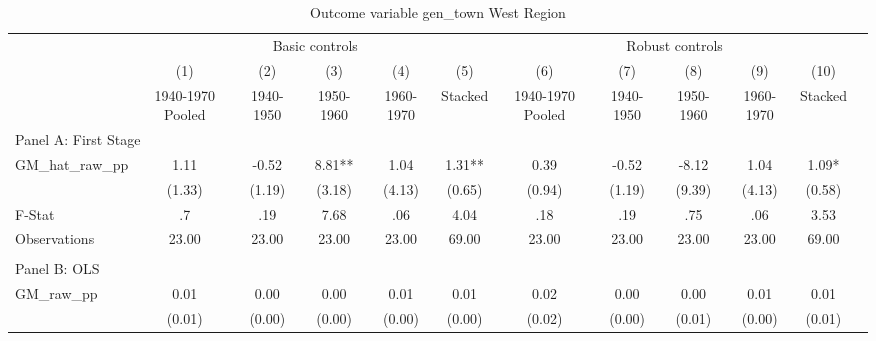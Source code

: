  \begin{table}[htbp]\centering {} \begin{threeparttable} \caption{Outcome variable gen\_town West Region} \begin{tabular}{l*{11}{c}} \toprule
          &\multicolumn{5}{c}{Basic controls}                                   &\multicolumn{5}{c}{Robust controls}                                  \\\cmidrule(lr){2-6}\cmidrule(lr){7-11}
          &\multicolumn{1}{c}{(1)}&\multicolumn{1}{c}{(2)}&\multicolumn{1}{c}{(3)}&\multicolumn{1}{c}{(4)}&\multicolumn{1}{c}{(5)}&\multicolumn{1}{c}{(6)}&\multicolumn{1}{c}{(7)}&\multicolumn{1}{c}{(8)}&\multicolumn{1}{c}{(9)}&\multicolumn{1}{c}{(10)}\\
          &\multicolumn{1}{c}{1940-1970 Pooled}&\multicolumn{1}{c}{1940-1950}&\multicolumn{1}{c}{1950-1960}&\multicolumn{1}{c}{1960-1970}&\multicolumn{1}{c}{Stacked}&\multicolumn{1}{c}{1940-1970 Pooled}&\multicolumn{1}{c}{1940-1950}&\multicolumn{1}{c}{1950-1960}&\multicolumn{1}{c}{1960-1970}&\multicolumn{1}{c}{Stacked}\\
\cmidrule(lr){1-11}
\multicolumn{10}{l}{Panel A: First Stage}\\
\cmidrule(lr){1-11}
GM\_hat\_raw\_pp&      1.11   &     -0.52   &      8.81** &      1.04   &      1.31** &      0.39   &     -0.52   &     -8.12   &      1.04   &      1.09*  \\
          &    (1.33)   &    (1.19)   &    (3.18)   &    (4.13)   &    (0.65)   &    (0.94)   &    (1.19)   &    (9.39)   &    (4.13)   &    (0.58)   \\
\midrule
F-Stat    &        .7   &       .19   &      7.68   &       .06   &      4.04   &       .18   &       .19   &       .75   &       .06   &      3.53   \\
Observations&     23.00   &     23.00   &     23.00   &     23.00   &     69.00   &     23.00   &     23.00   &     23.00   &     23.00   &     69.00   \\
\cmidrule[\heavyrulewidth](lr){1-11} \\ \cmidrule[\heavyrulewidth](lr){1-11}
\multicolumn{10}{l}{Panel B: OLS}\\
\cmidrule(lr){1-11}
GM\_raw\_pp &      0.01   &      0.00   &      0.00   &      0.01   &      0.01   &      0.02   &      0.00   &      0.00   &      0.01   &      0.01   \\
          &    (0.01)   &    (0.00)   &    (0.00)   &    (0.00)   &    (0.00)   &    (0.02)   &    (0.00)   &    (0.01)   &    (0.00)   &    (0.01)   \\

\end{tabular}
\end{threeparttable}
\end{table}

